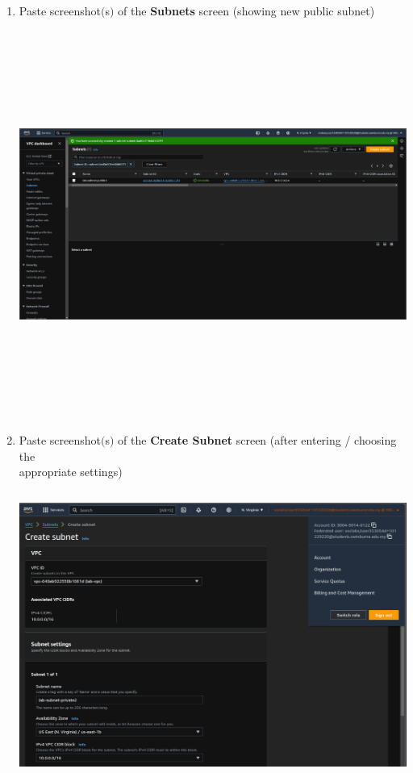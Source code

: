 \documentclass[11pt]{article}
\begin{document}
\begin{enumerate}[resume]
    
    \item Paste screenshot$($s$)$ of the \textbf{Subnets} screen (showing new public subnet) \\
    \vspace{2mm}

    {\centering
    \includegraphics[width=5.8in, height=5.0in]{pics/6.png}
    }
    
    \vspace{50mm}
    \item Paste screenshot$($s$)$ of the \textbf{Create Subnet} screen (after entering / choosing the \\ appropriate settings) \\
    \vspace{-0.02mm}

    {\centering
    \includegraphics[width=5.8in, height=3.7in]{pics/7a.png}
    }


\end{enumerate}
\end{document}
